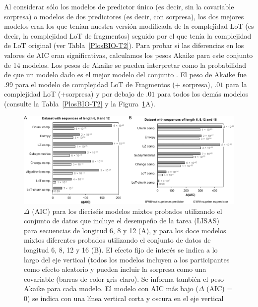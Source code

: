 Al considerar sólo los modelos de predictor único (es decir, sin la covariable sorpresa) o modelos de dos predictores (es decir, con sorpresa), los dos mejores modelos eran los que tenían nuestra versión modificada de la complejidad LoT (es decir, la complejidad LoT de fragmentos) seguido por el que tenía la complejidad de LoT original (ver Tabla~\ref{PlosBIO-T2}). Para probar si las diferencias en los valores de AIC eran significativas, calculamos los pesos Akaike para este conjunto de 14 modelos. Los pesos de Akaike se pueden interpretar como la probabilidad de que un modelo dado es el mejor modelo del conjunto \cite{f106}. El peso de Akaike fue $.99$ para el modelo de complejidad LoT de Fragmentos (+ sorpresa), $.01$ para la complejidad LoT (+sorpresa) y por debajo de $.01$ para todos los demás modelos (consulte la Tabla~\ref{PlosBIO-T2} y la Figura~\ref{PlosBIO-F8}A).

\begin{figure}[t!]
      \includegraphics[scale=0.8]{figuras/plosbio/journal.pcbi.1008598.g008.PNG}
     
      \centering
     
      \caption{$\Delta$ (AIC) para los dieciséis modelos mixtos probados utilizando el conjunto de datos que incluye el desempeño de la tarea (LISAS) para secuencias de longitud 6, 8 y 12 (A), y para los doce modelos mixtos diferentes probados utilizando el conjunto de datos de longitud 6, 8, 12 y 16 (B). El efecto fijo de interés se indica a lo largo del eje vertical (todos los modelos incluyen a los participantes como efecto aleatorio y pueden incluir la sorpresa como una covariable (barras de color gris claro). Se informa también el peso Akaike para cada modelo. El modelo con AIC más bajo ($\Delta$ (AIC) = 0) se indica con una línea vertical corta y oscura en el eje vertical}
      \label{PlosBIO-F8}
\end{figure}

